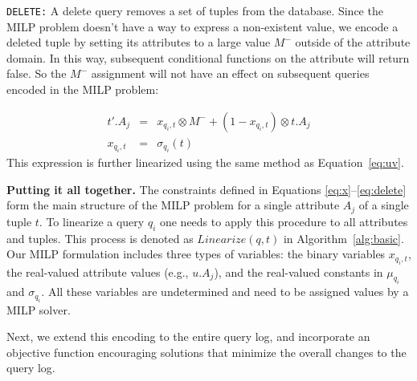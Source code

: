\smallskip
\noindent
\texttt{DELETE:}
A delete query removes a set of tuples from the database.  
Since the MILP problem doesn't have a way to express a non-existent value, 
we encode a deleted tuple by setting its attributes to a large value $M^-$ 
outside of the attribute domain. In this way, subsequent conditional functions on the attribute will return false. 
So the $M^-$ assignment will not have an effect on subsequent queries encoded in the MILP problem:

\begin{eqnarray}
\label{eq:delete}
t'.A_j &=& x_{q_i, t} \otimes M^- + (1-x_{q_i, t}) \otimes t.A_j \\
x_{q_i, t} &=& \sigma_{q_i}(t)\nonumber 
\end{eqnarray}
This expression is further linearized using the same method as Equation~\eqref{eq:uv}.

\smallskip
\noindent
\textbf{Putting it all together.}
The constraints defined in Equations \eqref{eq:x}--\eqref{eq:delete}
form the main structure of the MILP problem for a single attribute
$A_j$ of a single tuple $t$. To linearize a query $q_i$ one needs to
apply this procedure to all attributes and tuples. This process is
denoted as $Linearize(q, t)$ in Algorithm~\ref{alg:basic}. Our MILP
formulation includes three types of variables: the binary variables
$x_{q_i, t}$, the real-valued attribute values (e.g., $u.A_j$), and
the real-valued constants in $\mu_{q_i}$ and $\sigma_{q_i}$. All these
variables are undetermined and need to be assigned values by a MILP
solver.


Next, we extend this encoding to the entire query log,
and incorporate an objective function encouraging solutions
that minimize the overall changes to the query log.







